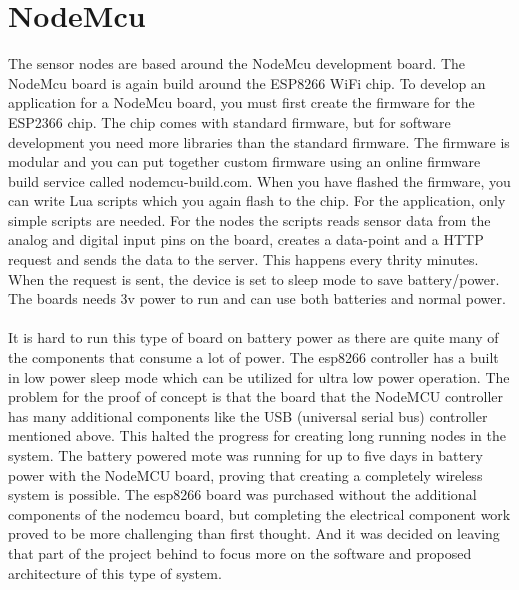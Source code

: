 \documentclass[]{uiophd}
\begin{document}
\section{NodeMcu}
The sensor nodes are based around the NodeMcu development board. The NodeMcu board is again build around the ESP8266 \cite{espressif} WiFi chip. To develop an application for a NodeMcu board, you must first create the firmware for the ESP2366 chip. The chip comes with standard firmware, but for software development you need more libraries than the standard firmware. The firmware is modular and you can put together custom firmware using an online firmware build service called nodemcu-build.com. When you have flashed the firmware, you can write Lua scripts which you again flash to the chip. For the application, only simple scripts are needed. For the nodes the scripts reads sensor data from the analog and digital input pins on the board, creates a data-point and a HTTP request and sends the data to the server. This happens every thrity minutes.  When the request is sent, the device is set to sleep mode to save battery/power. The boards needs 3v power to run and can use both batteries and normal power.
\\\\
It is hard to run this type of board on battery power as there are quite many of the components that consume a lot of power. The esp8266 controller has a built in low power sleep mode which can be utilized for ultra low power operation. The problem for the proof of concept is that the board that the NodeMCU controller has many additional components like the USB (universal serial bus) controller mentioned above. This halted the progress for creating long running nodes in the system. The battery powered mote was running for up to five days in battery power with the NodeMCU board, proving that creating a completely wireless system is possible. The esp8266 board was purchased without the additional components of the nodemcu board, but completing the electrical component work proved to be more challenging than first thought. And it was decided on leaving that part of the project behind to focus more on the software and proposed architecture of this type of system.
\end{document}
